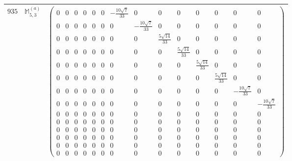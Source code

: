 \documentclass[fleqn,8pt,landscape]{jsarticle}
\begin{document}
\begin{center}
\begin{longtable}{ccc}
$ 935 $ & $ \mathbb{M}_{5,3}^{(a)} $ & $ \begin{pmatrix} 0 & 0 & 0 & 0 & 0 & 0 & - \frac{10 \sqrt{7}}{33} & 0 & 0 & 0 & 0 & 0 & 0 & 0 \\ 0 & 0 & 0 & 0 & 0 & 0 & 0 & - \frac{10 \sqrt{7}}{33} & 0 & 0 & 0 & 0 & 0 & 0 \\ 0 & 0 & 0 & 0 & 0 & 0 & 0 & 0 & \frac{5 \sqrt{14}}{33} & 0 & 0 & 0 & 0 & 0 \\ 0 & 0 & 0 & 0 & 0 & 0 & 0 & 0 & 0 & \frac{5 \sqrt{14}}{33} & 0 & 0 & 0 & 0 \\ 0 & 0 & 0 & 0 & 0 & 0 & 0 & 0 & 0 & 0 & \frac{5 \sqrt{14}}{33} & 0 & 0 & 0 \\ 0 & 0 & 0 & 0 & 0 & 0 & 0 & 0 & 0 & 0 & 0 & \frac{5 \sqrt{14}}{33} & 0 & 0 \\ 0 & 0 & 0 & 0 & 0 & 0 & 0 & 0 & 0 & 0 & 0 & 0 & - \frac{10 \sqrt{7}}{33} & 0 \\ 0 & 0 & 0 & 0 & 0 & 0 & 0 & 0 & 0 & 0 & 0 & 0 & 0 & - \frac{10 \sqrt{7}}{33} \\ 0 & 0 & 0 & 0 & 0 & 0 & 0 & 0 & 0 & 0 & 0 & 0 & 0 & 0 \\ 0 & 0 & 0 & 0 & 0 & 0 & 0 & 0 & 0 & 0 & 0 & 0 & 0 & 0 \\ 0 & 0 & 0 & 0 & 0 & 0 & 0 & 0 & 0 & 0 & 0 & 0 & 0 & 0 \\ 0 & 0 & 0 & 0 & 0 & 0 & 0 & 0 & 0 & 0 & 0 & 0 & 0 & 0 \\ 0 & 0 & 0 & 0 & 0 & 0 & 0 & 0 & 0 & 0 & 0 & 0 & 0 & 0 \\ 0 & 0 & 0 & 0 & 0 & 0 & 0 & 0 & 0 & 0 & 0 & 0 & 0 & 0 \end{pmatrix} $ \\ \hline

\end{longtable}
\end{center}
\end{document}
